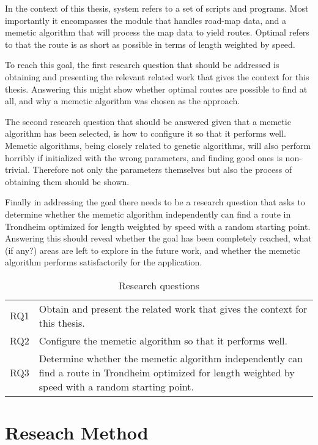 In the context of this thesis, system refers to a set of scripts and programs. Most importantly it encompasses the module that handles road-map data, and a memetic algorithm that will process the map data to yield routes. Optimal refers to that the route is as short as possible in terms of length weighted by speed.

To reach this goal, the first research question that should be addressed is obtaining and presenting the relevant related work that gives the context for this thesis. Answering this might show whether optimal routes are possible to find at all, and why a memetic algorithm was chosen as the approach.

The second research question that should be answered given that a memetic algorithm has been selected, is how to configure it so that it performs well. Memetic algorithms, being closely related to genetic algorithms,  will also perform horribly if initialized with the wrong parameters, and finding good ones is non-trivial. Therefore not only the parameters themselves but also the process of obtaining them should be shown.

Finally in addressing the goal there needs to be a research question that asks to determine whether the memetic algorithm independently can find a route in Trondheim optimized for length weighted by speed with a random starting point. Answering this should reveal whether the goal has been completely reached, what (if any?) areas are left to explore in the future work, and whether the memetic algorithm performs satisfactorily for the application.

\begin{table}[H]
\centering
\begin{tabular}{cp{}}
RQ1  &  Obtain and present the related work that gives the context for this thesis. \\
RQ2  &  Configure the memetic algorithm so that it performs well.\\
RQ3  &  Determine whether the memetic algorithm independently can find a route in Trondheim optimized for length weighted by speed with a random starting point. \\
\end{tabular}
\caption{Research questions}
\label{tab:research_questions}
\end{table}

\section{Reseach Method}

